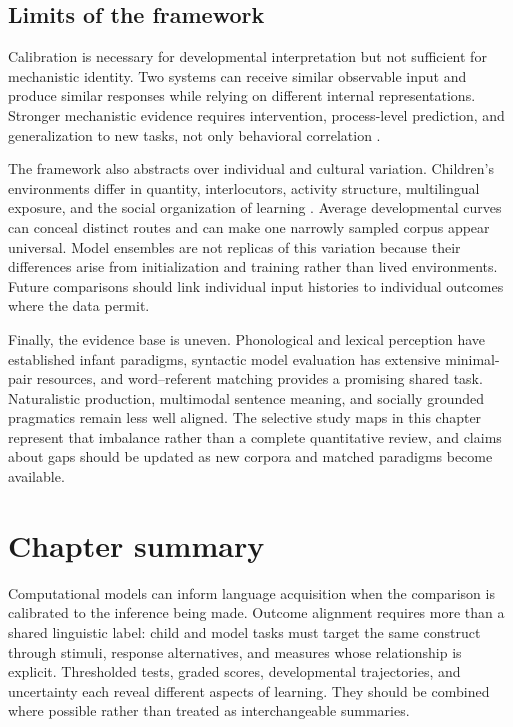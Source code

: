 \subsection{Limits of the framework}
\label{sec:litreview:limits}

Calibration is necessary for developmental interpretation but not sufficient for mechanistic identity. Two systems can receive similar observable input and produce similar responses while relying on different internal representations. Stronger mechanistic evidence requires intervention, process-level prediction, and generalization to new tasks, not only behavioral correlation \citep{marr_vision_1982,Perfors2011}.

The framework also abstracts over individual and cultural variation. Children's environments differ in quantity, interlocutors, activity structure, multilingual exposure, and the social organization of learning \citep{WeislederFernald2013,bergelson2023everyday}. Average developmental curves can conceal distinct routes and can make one narrowly sampled corpus appear universal. Model ensembles are not replicas of this variation because their differences arise from initialization and training rather than lived environments. Future comparisons should link individual input histories to individual outcomes where the data permit.

Finally, the evidence base is uneven. Phonological and lexical perception have established infant paradigms, syntactic model evaluation has extensive minimal-pair resources, and word--referent matching provides a promising shared task. Naturalistic production, multimodal sentence meaning, and socially grounded pragmatics remain less well aligned. The selective study maps in this chapter represent that imbalance rather than a complete quantitative review, and claims about gaps should be updated as new corpora and matched paradigms become available.


\section{Chapter summary}
\label{sec:litreview:summary}

Computational models can inform language acquisition when the comparison is calibrated to the inference being made. Outcome alignment requires more than a shared linguistic label: child and model tasks must target the same construct through stimuli, response alternatives, and measures whose relationship is explicit. Thresholded tests, graded scores, developmental trajectories, and uncertainty each reveal different aspects of learning. They should be combined where possible rather than treated as interchangeable summaries.


